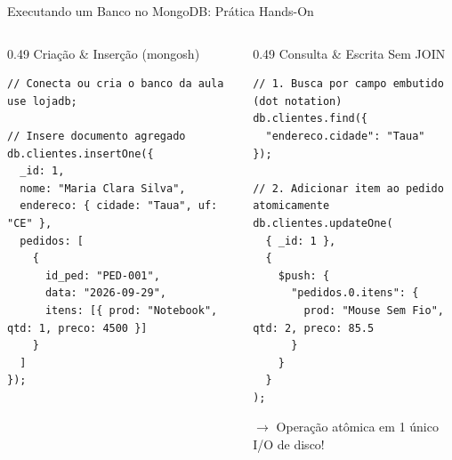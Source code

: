 \begin{frame}[fragile]{Executando um Banco no MongoDB: Prática Hands-On}
  \vspace{-0.3cm}
  \begin{columns}[t]
    \begin{column}{0.49\textwidth}
      \alert{Criação \& Inserção (mongosh)}\par
      \begin{lstlisting}[basicstyle=\ttfamily\tiny]
// Conecta ou cria o banco da aula
use lojadb;

// Insere documento agregado
db.clientes.insertOne({
  _id: 1,
  nome: "Maria Clara Silva",
  endereco: { cidade: "Taua", uf: "CE" },
  pedidos: [
    {
      id_ped: "PED-001",
      data: "2026-09-29",
      itens: [{ prod: "Notebook", qtd: 1, preco: 4500 }]
    }
  ]
});
      \end{lstlisting}
    \end{column}

    \begin{column}{0.49\textwidth}
      \alert{Consulta \& Escrita Sem JOIN}\par
      \begin{lstlisting}[basicstyle=\ttfamily\tiny]
// 1. Busca por campo embutido (dot notation)
db.clientes.find({
  "endereco.cidade": "Taua"
});

// 2. Adicionar item ao pedido atomicamente
db.clientes.updateOne(
  { _id: 1 },
  {
    $push: {
      "pedidos.0.itens": {
        prod: "Mouse Sem Fio", qtd: 2, preco: 85.5
      }
    }
  }
);
      \end{lstlisting}
      \scriptsize $\rightarrow$ Operação atômica em 1 único I/O de disco!
    \end{column}
  \end{columns}
\end{frame}

